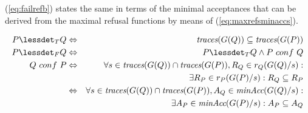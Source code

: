 (\ref{eq:failrefb}) states the same in terms of the minimal acceptances that
can be derived from the maximal refusal functions by means of
(\ref{eq:maxrefsminaccs}). 
%
\begin{lemma}
  \label{lemma:tgtrcref}
  \begin{eqnarray}
  P \lessdet_T Q & \Leftrightarrow & \trc(G(Q)) \subseteq\trc(G(P))
  \label{eq:trcrefa}
  \\
  \label{eq:failconf}
  P \lessdet_F Q & \Leftrightarrow & P \lessdet_T Q \wedge P\ conf\ Q
  \\
  \label{eq:failrefa}
  Q\ conf\ P & \Leftrightarrow & \nonumber
  \forall s\in\trc(G(Q))\cap \trc(G(P)), R_Q\in r_Q(G(Q)/s):  \nonumber
  \\ & & \tabd
  \exists R_P\in r_P(G(P)/s): R_Q\subseteq R_P
  \\
  \label{eq:failrefb}
   & \Leftrightarrow &
    \forall s\in\trc(G(Q))\cap \trc(G(P)), A_Q\in\minaccs(G(Q)/s):  \nonumber
   \\ & & \tabd
  \exists A_P\in\minaccs(G(P)/s): A_P\subseteq A_Q
 \end{eqnarray}
  \xbox
\end{lemma}
%
